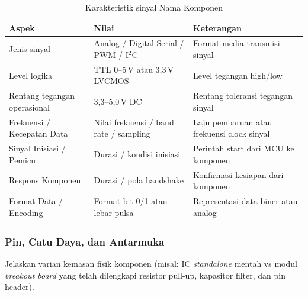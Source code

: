 \begin{table}[H]
	\centering
	\caption{Karakteristik sinyal Nama Komponen}
	\label{tab:nama_komponen_sinyal}
	\small
	\begin{tabularx}{\textwidth}{@{}lXX@{}}
		\toprule
		Aspek                       & Nilai                                    & Keterangan                                       \\
		\midrule
		Jenis sinyal                & Analog / Digital Serial / PWM / I$^2$C   & Format media transmisi sinyal                    \\
		Level logika                & TTL 0--5\,V atau 3,3\,V LVCMOS           & Level tegangan high/low                          \\
		Rentang tegangan operasional& 3,3--5,0\,V DC                           & Rentang toleransi tegangan sinyal                \\
		Frekuensi / Kecepatan Data  & Nilai frekuensi / baud rate / sampling   & Laju pembaruan atau frekuensi clock sinyal       \\
		Sinyal Inisiasi / Pemicu    & Durasi / kondisi inisiasi                & Perintah start dari MCU ke komponen              \\
		Respons Komponen            & Durasi / pola handshake                  & Konfirmasi kesiapan dari komponen                \\
		Format Data / Encoding      & Format bit 0/1 atau lebar pulsa          & Representasi data biner atau analog              \\
		\bottomrule
	\end{tabularx}
\end{table}

\subsubsection{Pin, Catu Daya, dan Antarmuka}
Jelaskan varian kemasan fisik komponen (misal: IC \textit{standalone} mentah vs modul \textit{breakout board}
yang telah dilengkapi resistor pull-up, kapasitor filter, dan pin header).

